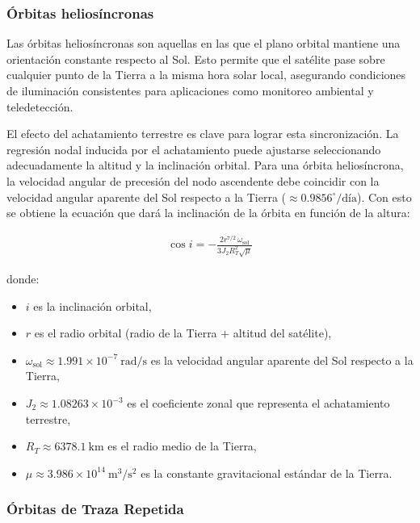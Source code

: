 \subsubsection{Órbitas heliosíncronas}\label{sec:SSO}

Las órbitas heliosíncronas son aquellas en las que el plano orbital mantiene una orientación constante respecto al Sol. Esto permite que el satélite pase sobre cualquier punto de la Tierra a la misma hora solar local, asegurando condiciones de iluminación consistentes para aplicaciones como monitoreo ambiental y teledetección.

El efecto del achatamiento terrestre es clave para lograr esta sincronización. La regresión nodal inducida por el achatamiento puede ajustarse seleccionando adecuadamente la altitud y la inclinación orbital. Para una órbita heliosíncrona, la velocidad angular de precesión del nodo ascendente debe coincidir con la velocidad angular aparente del Sol respecto a la Tierra (\( \approx 0.9856^\circ/\text{día} \)). Con esto se obtiene la ecuación que dará la inclinación de la órbita en función de la altura:

\begin{align}
\cos i = -\frac{2 r^{7/2} \, \omega_{\text{sol}}}{3 J_2 R_T^2 \sqrt{\mu}}
\end{align}

\noindent donde:

\begin{itemize}
    \item \( i \) es la inclinación orbital,
    \item \( r \) es el radio orbital (radio de la Tierra + altitud del satélite),
    \item \( \omega_{\text{sol}} \approx 1.991 \times 10^{-7} \ \text{rad/s} \) es la velocidad angular aparente del Sol respecto a la Tierra,
    \item \( J_2 \approx 1.08263 \times 10^{-3} \) es el coeficiente zonal que representa el achatamiento terrestre,
    \item \( R_T \approx 6378.1 \ \text{km} \) es el radio medio de la Tierra,
    \item \( \mu \approx 3.986 \times 10^{14} \ \text{m}^3/\text{s}^2 \) es la constante gravitacional estándar de la Tierra.
\end{itemize}

\subsubsection{Órbitas de Traza Repetida}


